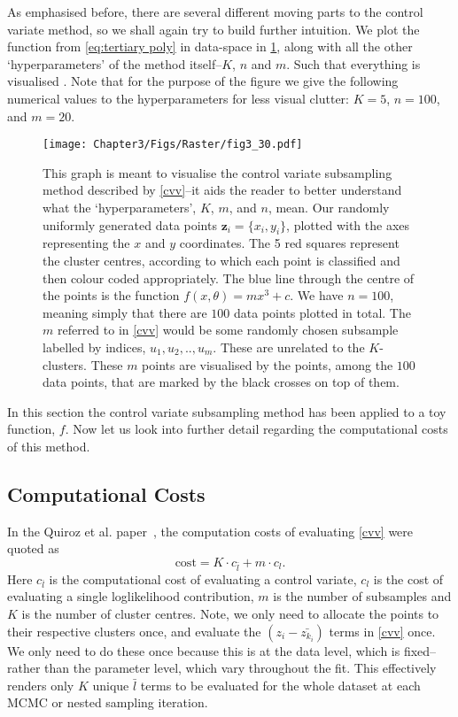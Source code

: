 As emphasised before, there are several different moving parts to the control variate method, so we shall again try to build further intuition. We plot the function from \cref{eq:tertiary poly} in data-space in \cref{fig:three}, along with all the other `hyperparameters' of the method itself--$K$, $n$ and $m$. Such that everything is visualised . Note that for the purpose of the figure we give the following numerical values to the hyperparameters for less visual clutter: $K=5$, $n=100$, and $m=20$.


\begin{figure} 
\centering    
\texttt{[image: Chapter3/Figs/Raster/fig3\_30.pdf]}
\caption{ This graph is meant to visualise the control variate subsampling method described by \cref{cvv}--it aids the reader to better understand what the `hyperparameters', $K$, $m$, and $n$, mean. Our randomly uniformly generated data points $\textbf{z}_i= \{x_i,y_i \}$, plotted with the axes representing the $x$ and $y$ coordinates. The 5 red squares represent the cluster centres, according to which each point is classified and then colour coded appropriately. The blue line through the centre of the points is the function $f(x,\theta)= mx^3+c$. We have $n=100$, meaning simply that there are $100$ data points plotted in total. The $m$ referred to in \cref{cvv} would be some randomly chosen subsample labelled by indices, ${u_1,u_2,..,u_m}$. These are unrelated to the $K$-clusters. These $m$ points are visualised by the points, among the $100$ data points, that are marked by the black crosses on top of them.}
\label{fig:three}
\end{figure}

In this section the control variate subsampling method has been applied to a toy function, $f$. Now let us look into further detail regarding the computational costs of this method.


\subsection{Computational Costs}\label{sec:computational_costs}
In the Quiroz et al. paper~\cite{Quiroz_2018}, the computation costs of evaluating \cref{cvv} were quoted as
%
\begin{equation}
\mathrm{cost} = K \cdot c_{\bar{l}} + m \cdot c_{l}.
\end{equation}
Here  $c_{\bar{l}}$ is the computational cost of evaluating a control variate, $c_{l}$ is the cost of evaluating a single loglikelihood contribution, $m$ is the number of subsamples and $K$ is the number of cluster centres. Note, we only need to allocate the points to their respective clusters once, and evaluate the $(z_i-\bar{z_{k_i}})$ terms in \cref{cvv} once. We only need to do these once because this is at the data level, which is fixed--rather than the parameter level, which vary throughout the fit. This effectively renders only $K$ unique $\bar{l}$ terms to be evaluated for the whole dataset at each MCMC or nested sampling iteration.

